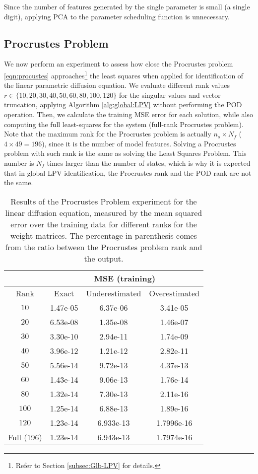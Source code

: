 Since the number of features generated by the single parameter is small (a single digit), applying PCA to the parameter scheduling function is unnecessary.

\subsection{Procrustes Problem}


We now perform an experiment to assess how close the Procrustes problem \eqref{eqn:procustes} approaches\footnote{Refer to Section \ref{subsec:Glb-LPV} for details.} the least squares when applied for identification of the linear parametric diffusion equation.
   We evaluate different rank values $r \in \{10,20,30,40,50,60,80,100,120\}$ for the singular values and vector truncation, applying Algorithm \ref{alg:global:LPV} without performing the POD operation. 
Then, we calculate the training MSE error for each solution, while also computing the full least-squares for the system (full-rank Procrustes problem). 
%
Note that the maximum rank for the Procrustes problem is actually $n_s \times N_f$ ($4 \times 49 = 196$), since it is the number of model features.
%
Solving a Procrustes problem with such rank is the same as solving the Least Squares Problem.
%
This number is $N_f$ times larger than the number of states, which is why it is expected that in global LPV identification, the Procrustes rank and the POD rank are not the same.



\begin{table}[]
    \caption{Results of the Procrustes Problem experiment for the linear diffusion equation, measured by the mean squared error over the training data for different ranks for the weight matrices. The percentage in parenthesis comes from the ratio between the Procrustes problem rank and the output.}
    \label{tab:procrustes_result_linear}
    \centering
    \begin{tabular}{|c|c|c|c|} 
      \cline{2-4}
     \multicolumn{1}{c}{}   & \multicolumn{3}{|c|}{MSE (training)} \\  \hline
      Rank & Exact & Underestimated & Overestimated \\\hline
      $10$ & 1.47e-05 & 6.37e-06 & 3.41e-05  \\ \hline
      $20$ & 6.53e-08 & 1.35e-08 & 1.46e-07 \\ \hline 
      $30$ & 3.30e-10 & 2.94e-11 & 1.74e-09 \\ \hline 
      $40$ & 3.96e-12 & 1.21e-12 & 2.82e-11 \\ \hline 
      $50$ & 5.56e-14 & 9.72e-13& 4.37e-13 \\ \hline
      $60$ & 1.43e-14 &9.06e-13 & 1.76e-14 \\ \hline
      $80$ & 1.32e-14 &7.30e-13 & 2.11e-16 \\ \hline
      $100$ & 1.25e-14 &6.88e-13 & 1.89e-16 \\ \hline
      $120$ & 1.23e-14 & 6.933e-13 & 1.7996e-16 \\ \hline
      Full ($196$)  & 1.23e-14 & 6.943e-13 & 1.7974e-16 \\
      \hline
    \end{tabular}
\end{table}


